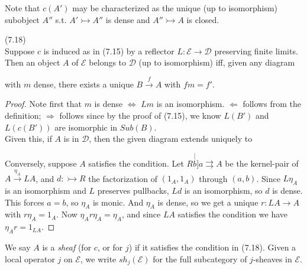 \documentclass[a4paper]{article}
\begin{document}
Note that $c(A')$ may be characterized as the unique (up to isomorphism) subobject $A''$ s.t. $A' \rightarrowtail A''$ is dense and $A'' \rightarrowtail A$ is closed.

\begin{lemma} (7.18)\\
    Suppose $c$ is induced as in (7.15) by a reflector $L:\mathcal{E} \to \mathcal{D}$ preserving finite limits. Then an object $A$ of $\mathcal{E}$ belongs to $\mathcal{D}$ (up to isomorphism) iff, given any diagram


    with $m$ dense, there exists a unique $B \xrightarrow{f} A$ with $fm = f'$.
    \begin{proof}
        Note first that $m$ is dense $\iff$ $Lm$ is an isomorphism. $\Leftarrow$ follows from the definition; $\Rightarrow$ follows since by the proof of (7.15), we know $L(B')$ and $L(c(B'))$ are isomorphic in $Sub(B)$.\\
        Given this, if $A$ is in $\mathcal{D}$, then the given diagram extends uniquely to


        Conversely, suppose $A$ satisfies the condition. Let $R \stackrel[b]{a}{\rightrightarrows} A$ be the kernel-pair of $A \xrightarrow{\eta_A} LA$, and $d:\rightarrowtail R$ the factorization of $(1_A,1_A)$ through $(a,b)$. Since $L\eta_A$ is an isomorphism and $L$ preserves pullbacks, $Ld$ is an isomorphism, so $d$ is dense.\\
        This forces $a=b$, so $\eta_A$ is monic. And $\eta_A$ is dense, so we get a unique $r:LA \to A$ with $r \eta_A = 1_A$. Now $\eta_A r \eta_A = \eta_A$, and since $LA$ satisfies the condition we have $\eta_A r = 1_{LA}$.
    \end{proof}
\end{lemma}

We say $A$ is a \emph{sheaf} (for $c$, or for $j$) if it satisfies the condition in (7.18). Given a local operator $j$ on $\mathcal{E}$, we write $sh_j(\mathcal{E})$ for the full subcategory of $j$-sheaves in $\mathcal{E}$.
\end{document}
